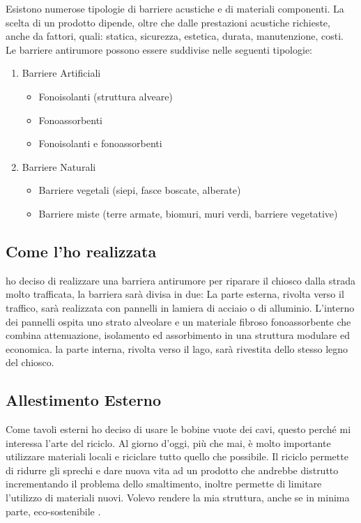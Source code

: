 Esistono numerose tipologie di barriere acustiche e di materiali componenti. La scelta di un prodotto dipende, oltre che dalle prestazioni acustiche richieste, anche da fattori, quali: statica, sicurezza, estetica, durata, manutenzione, costi. Le barriere antirumore possono essere suddivise nelle seguenti tipologie: 

\begin{enumerate}
	\item Barriere Artificiali
	\begin{itemize}
		\item Fonoisolanti (struttura alveare)
		\item Fonoassorbenti 
		\item Fonoisolanti e fonoassorbenti
	\end{itemize}
	
	\item Barriere Naturali
	\begin{itemize}
		\item Barriere vegetali (siepi, fasce boscate, alberate) 
		\item Barriere miste (terre armate, biomuri, muri verdi, barriere vegetative)
	\end{itemize}
\end{enumerate}


\subsection{Come l’ho realizzata}

ho deciso di realizzare una barriera antirumore per riparare il chiosco dalla strada molto trafficata, la barriera sarà divisa in due:
La parte esterna, rivolta verso il traffico, sarà realizzata con pannelli in lamiera di acciaio o di alluminio. L'interno dei pannelli ospita uno strato alveolare e un materiale fibroso fonoassorbente che combina attenuazione, isolamento ed assorbimento in una struttura modulare ed economica.
la parte interna, rivolta verso il lago, sarà rivestita dello stesso legno del chiosco. 

\subsection{Allestimento Esterno}

Come tavoli esterni ho deciso di usare le bobine vuote dei cavi, questo perché mi interessa l’arte del riciclo.
Al giorno d’oggi, più che mai, è molto importante utilizzare materiali locali e riciclare tutto quello che possibile.
Il riciclo permette di ridurre gli sprechi e  dare nuova vita ad un prodotto che andrebbe distrutto incrementando il problema dello smaltimento, inoltre permette di limitare l’utilizzo di materiali nuovi. 
Volevo rendere la mia struttura, anche se in minima parte, eco-sostenibile .

